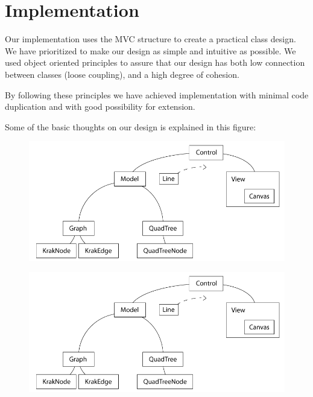\chapter{Implementation}
\label{IMPL}
Our implementation uses the MVC structure to create a practical class design. We
have prioritized to make our design as simple and intuitive as possible. We used
object oriented principles to assure that our design has both low connection
between classes (loose coupling), and a high degree of cohesion.

By following these principles we have achieved implementation with minimal code
duplication and with good possibility for extension.

Some of the basic thoughts on our design is explained in this figure:

\begin{figure}[h!]
\centering
\includegraphics[width=1\linewidth]{images/BasicDesign}
\label{The basic design of our implementation. The controller gets a collection
of lines, that the view will draw.}
\end{figure}

\begin{figure}[h!]
\centering
\includegraphics[width=1\linewidth]{images/BasicDesign}
\label{The pathfinding part of our implementation. The static Astar function
takes an Evaluator and a Graph and returns a path.}
\end{figure}

